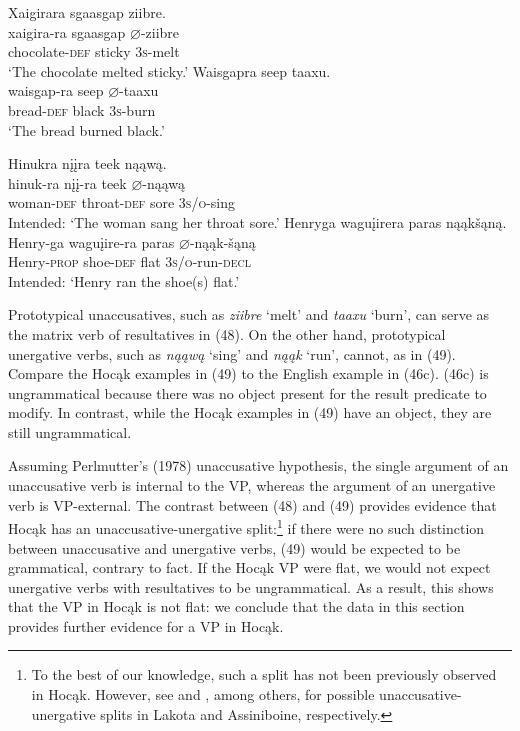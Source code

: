\documentclass[output=paper]{LSP/langsci}
\begin{document}
\begin{exe}
\ex
\begin{xlist}
\ex 
\glll Xaigirara			sgaasgap		ziibre.\\
xaigira-ra			sgaasgap		$\varnothing$-ziibre \\
	chocolate-\textsc{def}	sticky			\textsc{3s}-melt \\
\trans `The chocolate melted sticky.'
\ex 
\glll Waisgapra		seep		taaxu.\\
waisgap-ra		seep		$\varnothing$-taaxu \\
	bread-\textsc{def}		black		\textsc{3s}-burn \\
\trans `The bread burned black.'
\end{xlist}
\end{exe}
\begin{exe}
\ex
\begin{xlist}
\ex 
\glll *Hinukra			n\k{i}\k{i}ra				teek	n\k{a}\k{a}w\k{a}.\\
hinuk-ra			n\k{i}\k{i}-ra				teek	$\varnothing$-n\k{a}\k{a}w\k{a} \\
		woman-\textsc{def}	 throat-\textsc{def}	sore	\textsc{3s/o}-sing \\
\trans Intended: `The woman sang her throat sore.'
\ex 
\glll *Henryga			wagu\k{i}irera		paras		n\k{a}\k{a}k\v{s}\k{a}n\k{a}.\\
Henry-ga		wagu\k{i}ire-ra	paras		$\varnothing$-n\k{a}\k{a}k-\v{s}\k{a}n\k{a} \\
		Henry-\textsc{prop}	shoe-\textsc{def}			flat			\textsc{3s/o}-run-\textsc{decl} \\
\trans Intended: `Henry ran the shoe(s) flat.'
\end{xlist}
\end{exe}

Prototypical unaccusatives, such as \textit{ziibre} `melt' and \textit{taaxu} `burn', can serve as the matrix verb of resultatives in (48). On the other hand, prototypical unergative verbs, such as \textit{n\k{a}\k{a}w\k{a}} `sing' and \textit{n\k{a}\k{a}k} `run', cannot, as in (49). Compare the Hoc\k{a}k examples in (49) to the English example in (46c). (46c) is ungrammatical because there was no object present for the result predicate to modify. In contrast, while the Hoc\k{a}k examples in (49) have an object, they are still ungrammatical.
	
Assuming Perlmutter's (1978) unaccusative hypothesis, the single argument of an unaccusative verb is internal to the VP, whereas the argument of an unergative verb is VP-external. The contrast between (48) and (49) provides evidence that Hoc\k{a}k has an unaccusative-unergative split:\footnote{To the best of our knowledge, such a split has not been previously observed in Hoc\k{a}k. However, see \citet{Williamson1984} and \citet{West2003}, among others, for possible unaccusative-unergative splits in Lakota and Assiniboine, respectively.}  if there were no such distinction between unaccusative and unergative verbs, (49) would be expected to be grammatical, contrary to fact. If the Hoc\k{a}k VP were flat, we would not expect unergative verbs with resultatives to be ungrammatical. As a result, this shows that the VP in Hoc\k{a}k is not flat: we conclude that the data in this section provides further evidence for a VP in Hoc\k{a}k.
\end{document}
